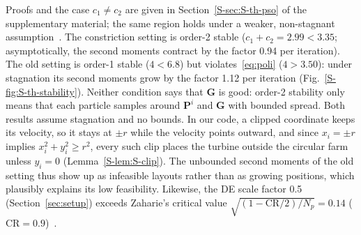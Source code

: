 Proofs and the case $c_1\ne c_2$ are given in Section~\ref{S-sec:S-th-pso} of the supplementary material; the same region holds under a weaker, non-stagnant assumption~\cite{Cleghorn2018}. The constriction setting is order-2 stable ($c_1+c_2=2.99<3.35$; asymptotically, the second moments contract by the factor 0.94 per iteration). The old setting is order-1 stable ($4<6.8$) but violates~\eqref{eq:poli} ($4>3.50$): under stagnation its second moments grow by the factor 1.12 per iteration (Fig.~\ref{S-fig:S-th-stability}). Neither condition says that $\mathbf G$ is good: order-2 stability only means that each particle samples around $\mathbf P^i$ and $\mathbf G$ with bounded spread. Both results assume stagnation and no bounds. In our code, a clipped coordinate keeps its velocity, so it stays at $\pm r$ while the velocity points outward, and since $x_i=\pm r$ implies $x_i^2+y_i^2\ge r^2$, every such clip places the turbine outside the circular farm unless $y_i=0$ (Lemma~\ref{S-lem:S-clip}). The unbounded second moments of the old setting thus show up as infeasible layouts rather than as growing positions, which plausibly explains its low feasibility. Likewise, the DE scale factor 0.5 (Section~\ref{sec:setup}) exceeds Zaharie's critical value $\sqrt{(1-\mathrm{CR}/2)/N_p}=0.14$ ($\mathrm{CR}=0.9$)~\cite{Zaharie2002}.
%
%
